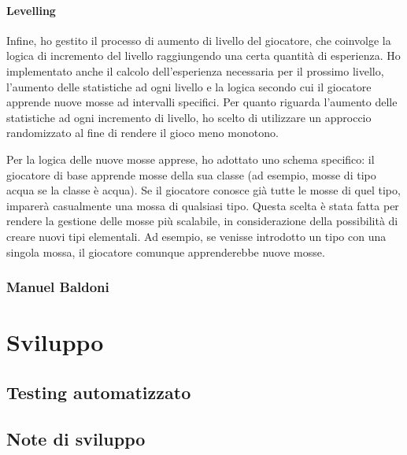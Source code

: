 \documentclass[a4paper,12pt]{report}
\begin{document}
\subsubsection{Levelling}
Infine, ho gestito il processo di aumento di livello del giocatore, che coinvolge la logica di incremento del livello raggiungendo una certa quantità di esperienza. Ho implementato anche il calcolo dell'esperienza necessaria per il prossimo livello, l'aumento delle statistiche ad ogni livello e la logica secondo cui il giocatore apprende nuove mosse ad intervalli specifici.
Per quanto riguarda l'aumento delle statistiche ad ogni incremento di livello, ho scelto di utilizzare un approccio randomizzato al fine di rendere il gioco meno monotono.

Per la logica delle nuove mosse apprese, ho adottato uno schema specifico: il giocatore di base apprende mosse della sua classe (ad esempio, mosse di tipo acqua se la classe è acqua). Se il giocatore conosce già tutte le mosse di quel tipo, imparerà casualmente una mossa di qualsiasi tipo. Questa scelta è stata fatta per rendere la gestione delle mosse più scalabile, in considerazione della possibilità di creare nuovi tipi elementali. Ad esempio, se venisse introdotto un tipo con una singola mossa, il giocatore comunque apprenderebbe nuove mosse.

\subsection*{Manuel Baldoni}


\chapter{Sviluppo}

\section{Testing automatizzato}
\section{Note di sviluppo}
\end{document}
